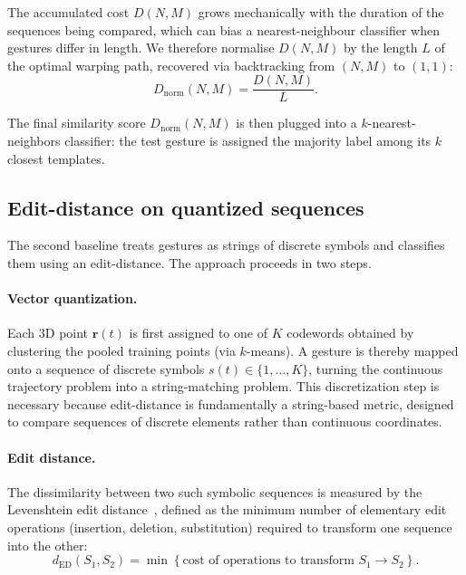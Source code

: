 The accumulated cost $D(N, M)$ grows mechanically with the duration of the
sequences being compared, which can bias a nearest-neighbour classifier when
gestures differ in length. We therefore normalise $D(N, M)$ by the length $L$
of the optimal warping path, recovered via backtracking from $(N, M)$ to $(1, 1)$:
\begin{equation}
\label{eq:dtw-norm}
    D_{\text{norm}}(N, M) = \frac{D(N, M)}{L} .
\end{equation}

The final similarity score $D_{\text{norm}}(N, M)$ is then plugged into a
$k$-nearest-neighbors classifier: the test gesture is assigned the majority
label among its $k$ closest templates.

\subsection{Edit-distance on quantized sequences}
The second baseline treats gestures as strings of discrete symbols and
classifies them using an edit-distance. The approach proceeds in two steps.
 
\paragraph{Vector quantization.} Each 3D point $\mathbf{r}(t)$ is first assigned
to one of $K$ codewords obtained by clustering the pooled training points
(via $k$-means). A gesture is thereby mapped onto a sequence of discrete
symbols $s(t) \in \{1, \dots, K\}$, turning the continuous trajectory problem
into a string-matching problem. This discretization step is necessary because
edit-distance is fundamentally a string-based metric, designed to compare
sequences of discrete elements rather than continuous coordinates.
 
\paragraph{Edit distance.} The dissimilarity between two such symbolic sequences
is measured by the Levenshtein edit distance~\cite{Levenshtein1966}, defined as
the minimum number of elementary edit operations (insertion, deletion,
substitution) required to transform one sequence into the other:
\begin{equation}
    d_{\text{ED}}(S_1, S_2) = \min \left\{ \text{cost of operations to transform } S_1 \to S_2 \right\} .
\end{equation}
 
